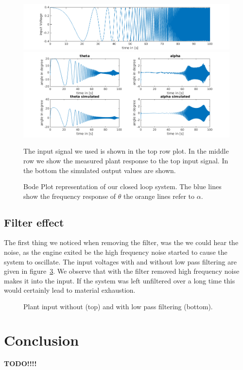 \documentclass[ twoside,openright,titlepage,numbers=noenddot,headinclude,%
                footinclude=true,cleardoublepage=empty,abstractoff, %
                BCOR=5mm,paper=a4,fontsize=11pt,%
                ngerman,american,%
                ]{scrreprt}
\begin{document}
\begin{figure}
\includegraphics[scale = 0.5]{images/input.png}
\includegraphics[scale = 0.505]{images/measSim2.png}
\caption{The input signal we used is shown in the top row plot. In the middle row we show the measured plant response to the top input signal. In the bottom the simulated output values are shown. }
\label{fig:timeDomain}
\end{figure}
\begin{figure}

%
\caption{Bode Plot representation of our closed loop system. The blue lines show the frequency response of $\theta$ the orange lines refer to $\alpha$.}
\label{fig:frequencyDomain}
\end{figure}

\section{Filter effect}
The first thing we noticed when removing the filter, was the we could hear the noise, as the engine exited be the high frequency noise started to cause the system to oscillate. The input voltages with and without low pass filtering are given in figure~\ref{fig:noise}. We observe that with the filter removed high frequency noise makes it into the input. If the system was left unfiltered over a long time this would certainly lead to material exhaustion. 
\begin{figure}

\caption{Plant input without (top) and with low pass filtering (bottom).}
\label{fig:noise}
\end{figure}

\chapter{Conclusion}
\textbf{TODO!!!!}
\end{document}
